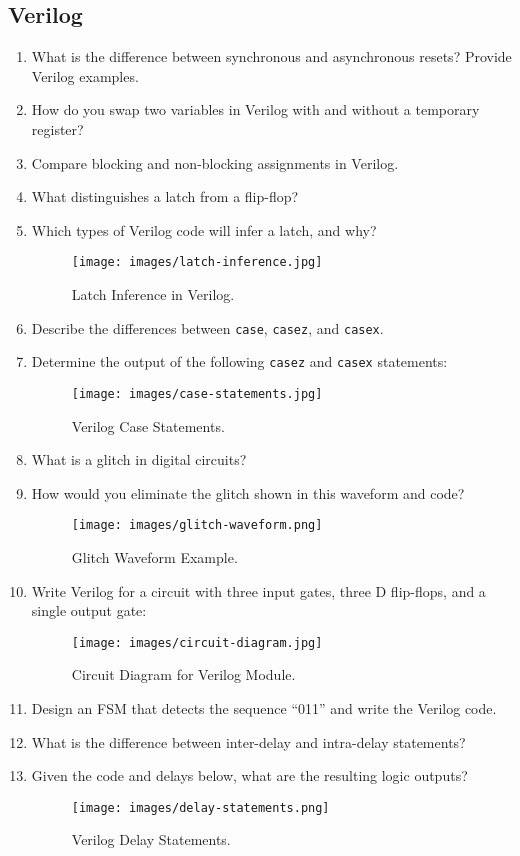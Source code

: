 \subsection*{Verilog}
\begin{enumerate}
    \item What is the difference between synchronous and asynchronous resets? Provide Verilog examples.
    \item How do you swap two variables in Verilog with and without a temporary register?
    \item Compare blocking and non-blocking assignments in Verilog.
    \item What distinguishes a latch from a flip-flop?
    \item Which types of Verilog code will infer a latch, and why?
        \begin{figure}[H]
            \centering
            \texttt{[image: images/latch-inference.jpg]}
            \caption{Latch Inference in Verilog.}
        \end{figure}
    \item Describe the differences between \texttt{case}, \texttt{casez}, and \texttt{casex}.
    \item Determine the output of the following \texttt{casez} and \texttt{casex} statements:
        \begin{figure}[H]
            \centering
            \texttt{[image: images/case-statements.jpg]}
            \caption{Verilog Case Statements.}
        \end{figure}
    \item What is a glitch in digital circuits?
    \item How would you eliminate the glitch shown in this waveform and code?
        \begin{figure}[H]
            \centering
            \texttt{[image: images/glitch-waveform.png]}
            \caption{Glitch Waveform Example.}
        \end{figure}
    \item Write Verilog for a circuit with three input gates, three D flip-flops, and a single output gate:
        \begin{figure}[H]
            \centering
            \texttt{[image: images/circuit-diagram.jpg]}
            \caption{Circuit Diagram for Verilog Module.}
        \end{figure}
    \item Design an FSM that detects the sequence “011” and write the Verilog code.
    \item What is the difference between inter-delay and intra-delay statements?
    \item Given the code and delays below, what are the resulting logic outputs?
        \begin{figure}[H]
            \centering
            \texttt{[image: images/delay-statements.png]}
            \caption{Verilog Delay Statements.}
        \end{figure}
\end{enumerate}

